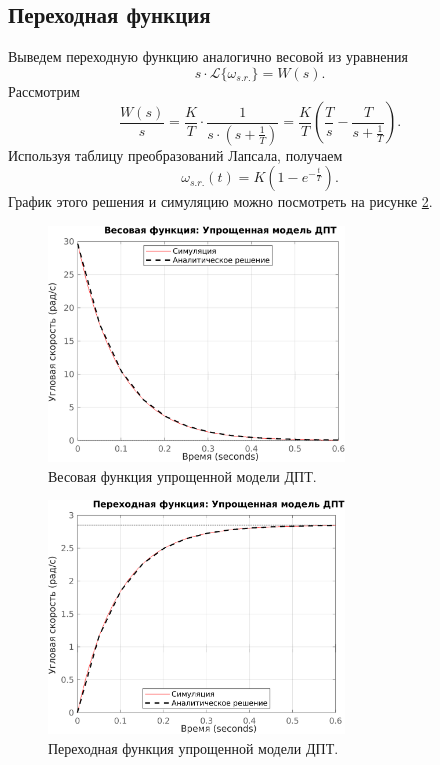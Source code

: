 \subsection{Переходная функция}

Выведем переходную функцию аналогично весовой из уравнения
\begin{equation*}
    s\cdot\mathcal L\{\omega_{s.r.}\}=W(s).
\end{equation*}
Рассмотрим
\[
\frac{W(s)}{s} = \frac{K}{T} \cdot \frac{1}{s\cdot(s + \frac{1}{T})}
=\frac{K}{T} \left( \frac{T}{s} - \frac{T}{s + \frac{1}{T}} \right).
\]
Используя таблицу преобразований Лапсала, получаем
\[
\omega_{s.r.}(t) = K \left( 1 - e^{-\frac{t}{T}} \right).
\]
График этого решения и симуляцию можно посмотреть на рисунке \ref{fig:task_1_step}.

\begin{figure}[htbp]
    \centering
    \includegraphics[width=0.7\textwidth]{figs/task_1_impl.png}
    \caption{Весовая функция упрощенной модели ДПТ.}
    \label{fig:task_1_impl}
\end{figure}

\begin{figure}[htbp]
    \centering
    \includegraphics[width=0.7\textwidth]{figs/task_1_step.png}
    \caption{Переходная функция упрощенной модели ДПТ.}
    \label{fig:task_1_step}
\end{figure}

